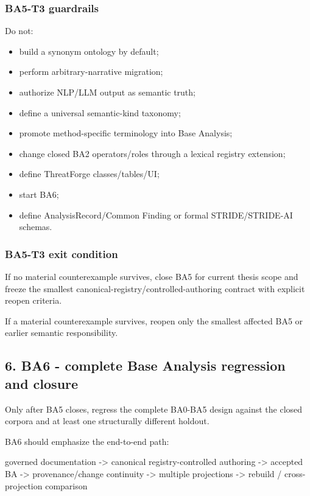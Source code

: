 \documentclass[
  10pt,
  a4paper,
]{article}
\newenvironment{Shaded}{}{}
\newcommand{\NormalTok}[1]{#1}
\providecommand{\tightlist}{%
  \setlength{\itemsep}{0pt}\setlength{\parskip}{0pt}}
\begin{document}
\subsubsection{BA5-T3 guardrails}\label{ba5-t3-guardrails}

Do not:

\begin{itemize}
\tightlist
\item
  build a synonym ontology by default;
\item
  perform arbitrary-narrative migration;
\item
  authorize NLP/LLM output as semantic truth;
\item
  define a universal semantic-kind taxonomy;
\item
  promote method-specific terminology into Base Analysis;
\item
  change closed BA2 operators/roles through a lexical registry
  extension;
\item
  define ThreatForge classes/tables/UI;
\item
  start BA6;
\item
  define AnalysisRecord/Common Finding or formal STRIDE/STRIDE-AI
  schemas.
\end{itemize}

\subsubsection{BA5-T3 exit condition}\label{ba5-t3-exit-condition}

If no material counterexample survives, close BA5 for current thesis
scope and freeze the smallest canonical-registry/controlled-authoring
contract with explicit reopen criteria.

If a material counterexample survives, reopen only the smallest affected
BA5 or earlier semantic responsibility.

\subsection{6. BA6 - complete Base Analysis regression and
closure}\label{ba6---complete-base-analysis-regression-and-closure}

Only after BA5 closes, regress the complete BA0-BA5 design against the
closed corpora and at least one structurally different holdout.

BA6 should emphasize the end-to-end path:

\begin{Shaded}
\begin{Highlighting}[]
\NormalTok{governed documentation}
\NormalTok{ {-}\textgreater{} canonical registry{-}controlled authoring}
\NormalTok{ {-}\textgreater{} accepted BA}
\NormalTok{ {-}\textgreater{} provenance/change continuity}
\NormalTok{ {-}\textgreater{} multiple projections}
\NormalTok{ {-}\textgreater{} rebuild / cross{-}projection comparison}
\end{Highlighting}
\end{Shaded}
\end{document}
